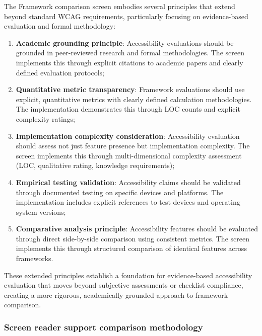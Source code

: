 The Framework comparison screen embodies several principles that extend beyond standard WCAG requirements, particularly focusing on evidence-based evaluation and formal methodology:

\begin{enumerate}
    \item \textbf{Academic grounding principle}: Accessibility evaluations should be grounded in peer-reviewed research and formal methodologies. The screen implements this through explicit citations to academic papers and clearly defined evaluation protocols;
    
    \item \textbf{Quantitative metric transparency}: Framework evaluations should use explicit, quantitative metrics with clearly defined calculation methodologies. The implementation demonstrates this through LOC counts and explicit complexity ratings;
    
    \item \textbf{Implementation complexity consideration}: Accessibility evaluation should assess not just feature presence but implementation complexity. The screen implements this through multi-dimensional complexity assessment (LOC, qualitative rating, knowledge requirements);
    
    \item \textbf{Empirical testing validation}: Accessibility claims should be validated through documented testing on specific devices and platforms. The implementation includes explicit references to test devices and operating system versions;
    
    \item \textbf{Comparative analysis principle}: Accessibility features should be evaluated through direct side-by-side comparison using consistent metrics. The screen implements this through structured comparison of identical features across frameworks.
\end{enumerate}

These extended principles establish a foundation for evidence-based accessibility evaluation that moves beyond subjective assessments or checklist compliance, creating a more rigorous, academically grounded approach to framework comparison.

\subsubsection{Screen reader support comparison methodology}


